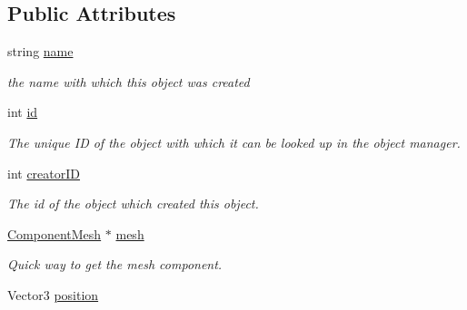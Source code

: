 \subsection*{\-Public \-Attributes}
\begin{DoxyCompactItemize}
\item 
\hypertarget{classObject_af849c7778ff8399ac4440062ac5a38a3}{
string \hyperlink{classObject_af849c7778ff8399ac4440062ac5a38a3}{name}}
\label{d8/d4b/classObject_af849c7778ff8399ac4440062ac5a38a3}

\begin{DoxyCompactList}\small\item\em the name with which this object was created \end{DoxyCompactList}\item 
\hypertarget{classObject_aa7caf12457afb8b79152cfaf0158c827}{
int \hyperlink{classObject_aa7caf12457afb8b79152cfaf0158c827}{id}}
\label{d8/d4b/classObject_aa7caf12457afb8b79152cfaf0158c827}

\begin{DoxyCompactList}\small\item\em \-The unique \-I\-D of the object with which it can be looked up in the object manager. \end{DoxyCompactList}\item 
\hypertarget{classObject_ac6cad05b3feb870850791666b8568310}{
int \hyperlink{classObject_ac6cad05b3feb870850791666b8568310}{creator\-I\-D}}
\label{d8/d4b/classObject_ac6cad05b3feb870850791666b8568310}

\begin{DoxyCompactList}\small\item\em \-The id of the object which created this object. \end{DoxyCompactList}\item 
\hypertarget{classObject_a90fa2f2b5de115aaf2f3afeb9eb7e229}{
\hyperlink{classComponentMesh}{\-Component\-Mesh} $\ast$ \hyperlink{classObject_a90fa2f2b5de115aaf2f3afeb9eb7e229}{mesh}}
\label{d8/d4b/classObject_a90fa2f2b5de115aaf2f3afeb9eb7e229}

\begin{DoxyCompactList}\small\item\em \-Quick way to get the mesh component. \end{DoxyCompactList}\item 
\hypertarget{classObject_ada6b49bf1d36879f1ce84cd29d5f8e8e}{
\-Vector3 \hyperlink{classObject_ada6b49bf1d36879f1ce84cd29d5f8e8e}{position}}
\label{d8/d4b/classObject_ada6b49bf1d36879f1ce84cd29d5f8e8e}


\end{DoxyCompactItemize}
